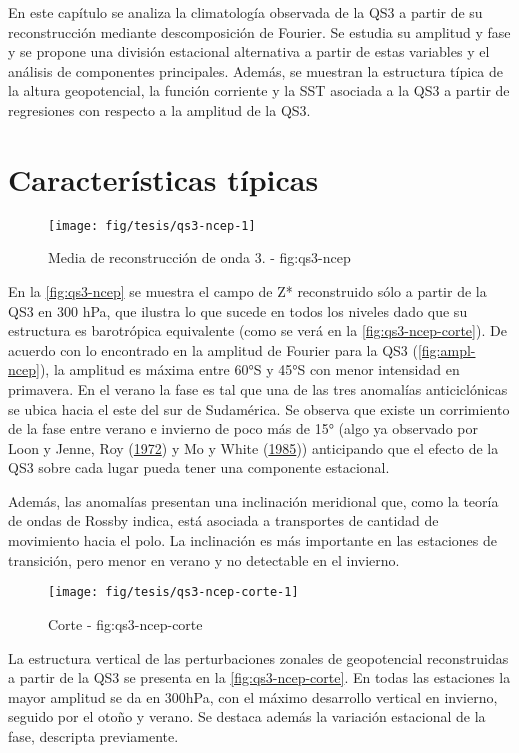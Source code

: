 \documentclass[spanish,a4paper,12p]{book}
\begin{document}
En este capítulo se analiza la climatología observada de la QS3 a partir
de su reconstrucción mediante descomposición de Fourier. Se estudia su
amplitud y fase y se propone una división estacional alternativa a
partir de estas variables y el análisis de componentes principales.
Además, se muestran la estructura típica de la altura geopotencial, la
función corriente y la SST asociada a la QS3 a partir de regresiones con
respecto a la amplitud de la QS3.

\section{Características típicas}\label{caracteristicas-tipicas}

\begin{figure*}
\texttt{[image: fig/tesis/qs3-ncep-1]} \caption{Media de reconstrucción de onda 3. - fig:qs3-ncep}\label{fig:qs3-ncep}
\end{figure*}

En la \autoref{fig:qs3-ncep} se muestra el campo de Z* reconstruido sólo
a partir de la QS3 en 300 hPa, que ilustra lo que sucede en todos los
niveles dado que su estructura es barotrópica equivalente (como se verá
en la \autoref{fig:qs3-ncep-corte}). De acuerdo con lo encontrado en la
amplitud de Fourier para la QS3 (\autoref{fig:ampl-ncep}), la amplitud
es máxima entre 60°S y 45°S con menor intensidad en primavera. En el
verano la fase es tal que una de las tres anomalías anticiclónicas se
ubica hacia el este del sur de Sudamérica. Se observa que existe un
corrimiento de la fase entre verano e invierno de poco más de 15° (algo
ya observado por Loon y Jenne, Roy
(\protect\hyperlink{ref-Loon1972}{1972}) y Mo y White
(\protect\hyperlink{ref-Mo1985}{1985})) anticipando que el efecto de la
QS3 sobre cada lugar pueda tener una componente estacional.

Además, las anomalías presentan una inclinación meridional que, como la
teoría de ondas de Rossby indica, está asociada a transportes de
cantidad de movimiento hacia el polo. La inclinación es más importante
en las estaciones de transición, pero menor en verano y no detectable en
el invierno.

\begin{figure*}
\texttt{[image: fig/tesis/qs3-ncep-corte-1]} \caption{Corte - fig:qs3-ncep-corte}\label{fig:qs3-ncep-corte}
\end{figure*}

La estructura vertical de las perturbaciones zonales de geopotencial
reconstruidas a partir de la QS3 se presenta en la
\autoref{fig:qs3-ncep-corte}. En todas las estaciones la mayor amplitud
se da en 300hPa, con el máximo desarrollo vertical en invierno, seguido
por el otoño y verano. Se destaca además la variación estacional de la
fase, descripta previamente.
\end{document}
